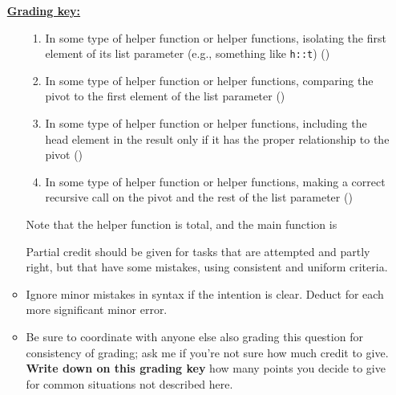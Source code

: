 \documentclass[11pt,fleqn]{article}
\begin{document}
\begin{enumerate}
\begin{info}{\textbf{\underline{Grading key:}}}
\begin{itemize}
\begin{enumerate}
                      \item In some type of helper function or helper
                            functions, isolating the first element of its
                            list parameter (e.g., something like
                            \texttt{h::t}) ()

                      \item In some type of helper function or helper
                            functions, comparing the pivot to the first
                            element of the list parameter ()

                      \item In some type of helper function or helper
                            functions, including the head element in the
                            result only if it has the proper relationship to
                            the pivot ()

                      \item In some type of helper function or helper
                            functions, making a correct recursive call on
                            the pivot and the rest of the list parameter
                            ()

                    \end{enumerate}

                    \medskip

                    Note that the helper function is  total, and the
                    main function is 

                    \medskip

                    Partial credit should be given for tasks that are
                    attempted and partly right, but that have some
                    mistakes, using consistent and uniform criteria.

                    \smallskip

              \item Ignore minor mistakes in syntax if the intention is
                    clear.  Deduct  for each more significant minor
                    error.

              \item Be sure to coordinate with anyone else also grading this
                    question for consistency of grading; ask me if you're
                    not sure how much credit to give.  \textbf{Write down on
                    this grading key} how many points you decide to give
                    for common situations not described here.


\end{itemize}
\end{info}
\end{enumerate}
\end{document}
